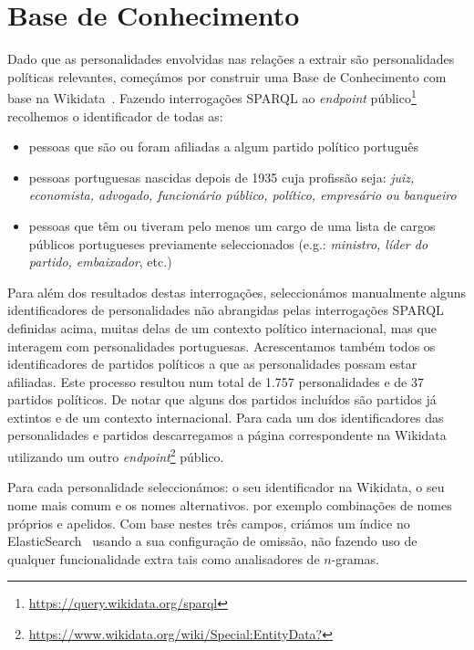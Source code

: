 \documentclass[a4paper, twocolumn, 11pt, twoside]{article}
\begin{document}
\section{Base de Conhecimento}
\label{sec_kb}
Dado que as personalidades envolvidas nas relações a extrair são personalidades políticas relevantes, começámos por construir uma Base de Conhecimento com base na Wikidata~\citep{MKGGB2018}. Fazendo interrogações SPARQL ao \textit{endpoint} público\footnote{\url{https://query.wikidata.org/sparql}} recolhemos o identificador de todas as:

\begin{itemize}  
\item pessoas que são ou foram afiliadas a algum partido político português
\item pessoas portuguesas nascidas depois de 1935 cuja profissão seja: \textit{juiz, economista, advogado, funcionário público, político, empresário ou banqueiro}
\item pessoas que têm ou tiveram pelo menos um cargo de uma lista de cargos públicos portugueses previamente seleccionados (e.g.: \textit{ministro, líder do partido, embaixador}, etc.)
\end{itemize}  

Para além dos resultados destas interrogações, seleccionámos manualmente alguns identificadores de personalidades não abrangidas pelas interrogações SPARQL definidas acima, muitas delas de um contexto político internacional, mas que interagem com personalidades portuguesas. Acrescentamos também todos os identificadores de partidos políticos a que as personalidades possam estar afiliadas. Este processo resultou num total de 1.757 personalidades e de 37 partidos políticos. De notar que alguns dos partidos incluídos são partidos já extintos e de um contexto internacional. Para cada um dos identificadores das personalidades e partidos descarregamos a página correspondente na Wikidata utilizando um outro \textit{endpoint}\footnote{\url{https://www.wikidata.org/wiki/Special:EntityData?}} público.


Para cada personalidade seleccionámos: o seu identificador na Wikidata, o seu nome mais comum e os nomes alternativos. por exemplo combinações de nomes próprios e apelidos. Com base nestes três campos, criámos um índice no ElasticSearch~\citep{10.5555/2904394} usando a sua configuração de omissão, não fazendo uso de qualquer funcionalidade extra tais como analisadores de $n$-gramas.
\end{document}
